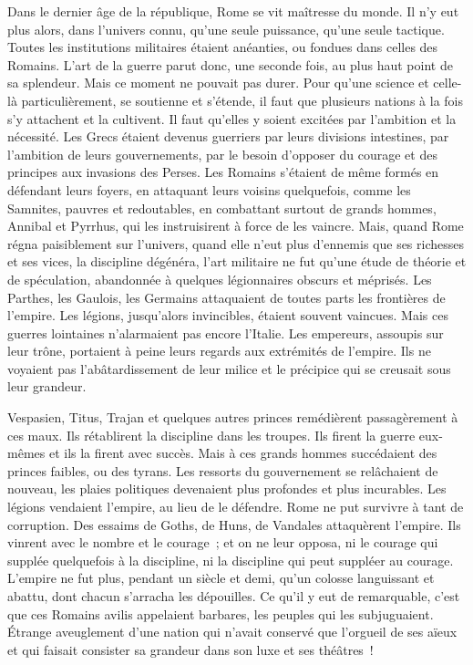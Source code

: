 \documentclass[french,twoside]{book} %
\begin{document}
Dans le dernier âge de la république, Rome se vit maîtresse du monde. Il n’y eut plus alors, dans l’univers connu, qu’une seule puissance, qu’une seule tactique. Toutes les institutions militaires étaient anéanties, ou fondues dans celles des Romains. L’art de la guerre parut donc, une seconde fois, au plus haut point de sa splendeur. Mais ce moment ne pouvait pas durer. Pour qu’une science et celle-là particulièrement, se soutienne et s’étende, il faut que plusieurs nations à la fois s’y attachent et la cultivent. Il faut qu’elles y soient excitées par l’ambition et la nécessité. Les Grecs étaient devenus guerriers par leurs divisions intestines, par l’ambition de leurs gouvernements, par le besoin d’opposer du courage et des principes aux invasions des Perses. Les Romains s’étaient de même formés en défendant leurs foyers, en attaquant leurs voisins quelquefois, comme les Samnites, pauvres et redoutables, en combattant surtout de grands hommes, Annibal et Pyrrhus, qui les instruisirent à force de les vaincre. Mais, quand Rome régna paisiblement sur l’univers, quand elle n’eut plus d’ennemis que ses richesses et ses vices, la discipline dégénéra, l’art militaire ne fut qu’une étude de théorie et de spéculation, abandonnée à quelques légionnaires obscurs et méprisés. Les Parthes, les Gaulois, les Germains attaquaient de toutes parts les frontières de l’empire. Les légions, jusqu’alors invincibles, étaient souvent vaincues. Mais ces guerres lointaines n’alarmaient pas encore l’Italie. Les empereurs, assoupis sur leur trône, portaient à peine leurs regards aux extrémités de l’empire. Ils ne voyaient pas l’abâtardissement de leur milice et le précipice qui se creusait sous leur grandeur.\par
Vespasien, Titus, Trajan et quelques autres princes remédièrent passagèrement à ces maux. Ils rétablirent la discipline dans les troupes. Ils firent la guerre eux-mêmes et ils la firent avec succès. Mais à ces grands hommes succédaient des princes faibles, ou des tyrans. Les ressorts du gouvernement se relâchaient de nouveau, les plaies politiques devenaient plus profondes et plus incurables. Les légions vendaient l’empire, au lieu de le défendre. Rome ne put survivre à tant de corruption. Des essaims de Goths, de Huns, de Vandales attaquèrent l’empire. Ils vinrent avec le nombre et le courage ; et on ne leur opposa, ni le courage qui supplée quelquefois à la discipline, ni la discipline qui peut suppléer au courage. L’empire ne fut plus, pendant un siècle et demi, qu’un colosse languissant et abattu, dont chacun s’arracha les dépouilles. Ce qu’il y eut de remarquable, c’est que ces Romains avilis appelaient barbares, les peuples qui les subjuguaient. Étrange aveuglement d’une nation qui n’avait conservé que l’orgueil de ses aïeux et qui faisait consister sa grandeur dans son luxe et ses théâtres !\par
\end{document}
